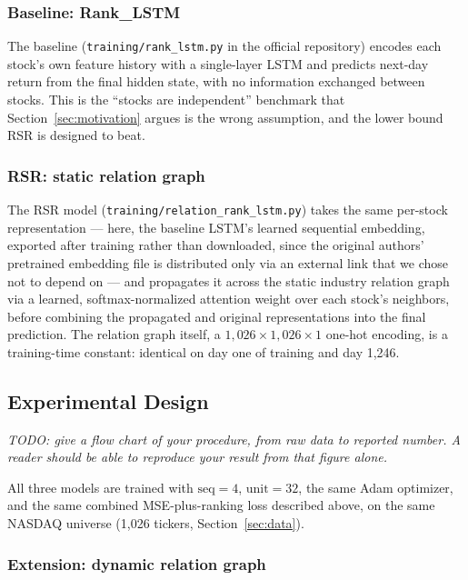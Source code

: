 \documentclass[12pt]{article}
\newcommand{\inst}[1]{\textit{#1}}
\begin{document}
\subsubsection{Baseline: Rank\_LSTM}

The baseline (\texttt{training/rank\_lstm.py} in the official repository) encodes each stock's own
feature history with a single-layer LSTM and predicts next-day return from the final hidden state,
with no information exchanged between stocks. This is the ``stocks are independent'' benchmark
that Section~\ref{sec:motivation} argues is the wrong assumption, and the lower bound RSR is
designed to beat.

\subsubsection{RSR: static relation graph}

The RSR model (\texttt{training/relation\_rank\_lstm.py}) takes the same per-stock representation
--- here, the baseline LSTM's learned sequential embedding, exported after training rather than
downloaded, since the original authors' pretrained embedding file is distributed only via an
external link that we chose not to depend on --- and propagates it across the static industry
relation graph via a learned, softmax-normalized attention weight over each stock's neighbors,
before combining the propagated and original representations into the final prediction. The
relation graph itself, a $1{,}026\times1{,}026\times1$ one-hot encoding, is a training-time
constant: identical on day one of training and day 1{,}246.

\subsection{Experimental Design}

\inst{TODO: give a flow chart of your procedure, from raw data to reported number. A reader
should be able to reproduce your result from that figure alone.}

All three models are trained with $\text{seq}=4$, $\text{unit}=32$, the same Adam optimizer, and
the same combined MSE-plus-ranking loss described above, on the same NASDAQ universe
(1{,}026 tickers, Section~\ref{sec:data}).

\subsubsection{Extension: dynamic relation graph}
\end{document}
